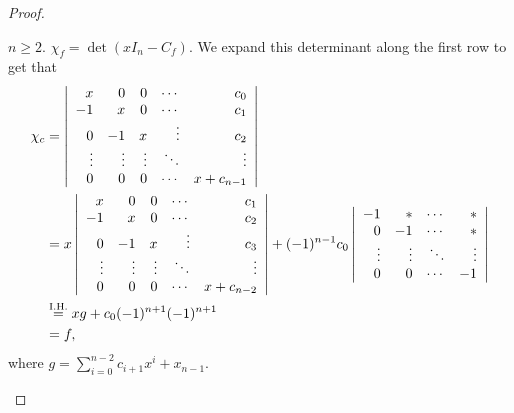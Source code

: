 \documentclass[11pt]{book}
\theoremstyle{definition}   \newtheorem{defn}[counter]{Definition} %
\newcommand{\mydet}[2]{\left| \begin{array}{#1} #2 \end{array} \right|} \newcommand{\myvec}[1]{\left( \begin{array}{c} #1 \end{array} \right)}
\numberwithin{counter}{chapter}
\begin{document}
\begin{proof}
\begin{enumerate}
$n \geq 2$. $\chi_f = \det (xI_n - C_f)$. We expand this determinant along the first row to get that
\begin{align*}
\chi_c &= \mydet{rrrrr}{x & 0 & 0 & \cdots & c_0 \\
                       -1 & x & 0 & \cdots & c_1 \\
                       0 & -1 & x & \vdots  & c_2\\
                       \vdots & \vdots & \vdots & \ddots & \vdots \\
                       0 & 0 & 0 & \cdots & x + c_{n-1}} \\
                       &= x \mydet{rrrrr}{x & 0 & 0 & \cdots & c_1 \\
                                              -1 & x & 0 & \cdots & c_2 \\
                                              0 & -1 & x & \vdots  & c_3\\
                                              \vdots & \vdots & \vdots & \ddots & \vdots \\
                                              0 & 0 & 0 & \cdots & x + c_{n-2}} + (-1)^{n-1} c_0 \mydet{rrrr}{-1 & \ast & \cdots & \ast \\
                                                           0 & -1 & \cdots & \ast \\
                                                           \vdots & \vdots & \ddots & \vdots \\
                                                           0 & 0 & \cdots & -1} \\
        &\overset{\tn{I.H.}}{=} x g + c_0 (-1)^{n+1} (-1)^{n+1} \\
        &= f,
\end{align*}
where $g = \sum_{i=0}^{n-2} c_{i+1} x^i + x_{n-1}$.
\end{enumerate}
\end{proof}
\end{document}
